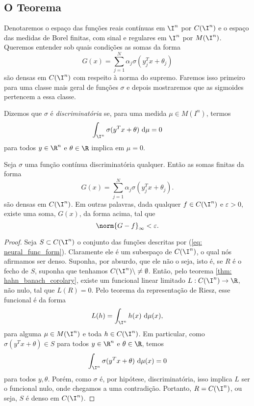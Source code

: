 \subsection{O Teorema}

Denotaremos o espaço das funções reais contínuas em \( \I^{ n } \) por \( C(\I^{ n }) \) e o espaço das medidas de Borel finitas, com sinal e regulares em \( \I^{ n } \) por \( M(\I^{ n }) \).
Queremos entender sob quais condições as somas da forma \[
    G(x) = \sum_{ j=1 }^{ N } \alpha_{ j } \sigma(y_{ j }^{ T }x + \theta_{ j })
\]
são densas em \( C(\I^{ n }) \) com respeito à norma do supremo.
Faremos isso primeiro para uma classe mais geral de funções \( \sigma \) e depois mostraremos que as sigmoides pertencem a essa classe.

\begin{defn}
    Dizemos que \( \sigma \) é \emph{discriminatória} se, para uma medida \( \mu \in M(I^{ n }) \), termos \[
        \int_{ \I^{ n } } \sigma(y^{ T }x + \theta)  \ \mathrm{d}\mu = 0
    \]
    para todos \( y \in \R^{ n } \) e \( \theta \in \R \) implica em \( \mu = 0 \).
\end{defn}

\begin{teo}
    Seja \( \sigma \) uma função contínua discriminatória qualquer.
    Então as somas finitas da forma
    \begin{equation}
        G(x) = \sum_{ j=1 }^{ N } \alpha_{ j } \sigma(y_{ j }^{ T }x + \theta_{ j })
        \label{eq: neural_func_form}
    .\end{equation}
    são densas em \( C(\I^{ n }) \).
    Em outras palavras, dada qualquer \( f \in C(\I^{ n }) \) e \( \varepsilon > 0 \), existe uma soma, \( G(x) \), da forma acima, tal que \[
        \norm{ G - f }_{ \infty } < \varepsilon
    .\]
\end{teo}

\begin{proof}
    Seja \( S \subset C(\I^{ n }) \) o conjunto das funções descritas por (\ref{eq: neural_func_form}).
    Claramente ele é um subespaço de \( C(\I^{ n }) \), o qual nós afirmamos ser denso.
    Suponha, por absurdo, que ele não o seja, isto é, se \( R \) é o fecho de \( S \), suponha que tenhamos \( C(\I^{ n }) \backslash \neq \emptyset \).
    Então, pelo teorema \ref{thm: hahn_banach_corolary}, existe um funcional linear limitado \( L : C(\I^{ n }) \to \R \), não nulo, tal que \( L(R) = 0 \).
    Pelo teorema da representação de Riesz, esse funcional é da forma \[
        L(h)
        = \int_{ \I^{ n } } h(x) \ \mathrm{d}\mu(x)
    ,\]
    para alguma \( \mu \in M(\I^{ n }) \) e toda \( h \in C(\I^{ n }) \).
    Em particular, como \( \sigma(y^{ T }x + \theta) \in S \) para todos \( y \in \R^{ n } \) e \( \theta \in \R \), temos \[
        \int_{ \I^{ n } } \sigma(y^{ T }x + \theta) \ \mathrm{d}\mu(x) = 0
    \]
    para todos \( y, \theta \).
    Porém, como \( \sigma \) é, por hipótese, discriminatória, isso implica \( L \) ser o funcional nulo, onde chegamos a uma contradição.
    Portanto, \( R = C(\I^{ n }) \), ou seja, \( S \) é denso em \( C(\I^{ n }) \).
\end{proof}

